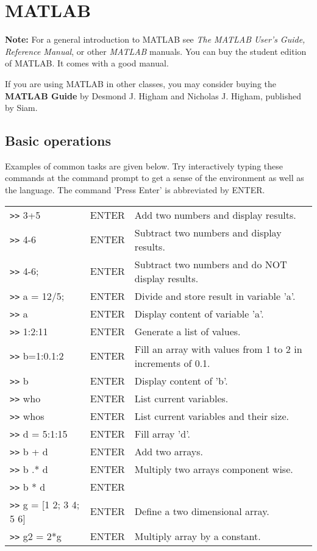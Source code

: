 
\newcommand{\mlc}[1] {\texttt{>> #1 }}
\newcommand{\ttt}[1]{\texttt{#1}}

\section{MATLAB} 

\textbf{Note:} For a general introduction to MATLAB see \textit{The
  MATLAB User's Guide, Reference Manual}, or other \textit{MATLAB}
manuals.  You can buy the student edition of MATLAB.  It comes with a
good manual. 

If you are using MATLAB in other classes, you may consider buying the 
\textbf{MATLAB Guide} by Desmond J. Higham and Nicholas J. Higham, published
by Siam.  

\subsection{Basic operations} Examples of common tasks are given
below.  Try interactively typing these commands at the command prompt
to get a sense of the environment as well as the language. The
command 'Press Enter' is abbreviated by ENTER.

\vspace{2em}


\begin{tabular}{lll} 
  \ttt{>>} 3+5     &ENTER   &Add two numbers and display results. \\ 
  \ttt{>>} 4-6     &ENTER   &Subtract two numbers and display results. \\ 
  \ttt{>>} 4-6;    &ENTER   &Subtract two numbers and do NOT
  display results.\\
  \ttt{>>} a = 12/5; &ENTER   &Divide and store result in variable 'a'.\\
  \ttt{>>} a        &ENTER  &Display content of variable 'a'. \\
  \ttt{>>} 1:2:11   &ENTER  &Generate a list of values. \\
  \ttt{>>} b=1:0.1:2 &ENTER & Fill an array with values from 1 to
  2 in increments of 0.1.\\
  \ttt{>>} b          &ENTER & Display content of 'b'. \\
  \ttt{>>} who      &ENTER  &List current variables. \\
  \ttt{>>} whos     &ENTER  &List current variables and their size.\\
  \ttt{>>} d = 5:1:15 &ENTER &Fill array 'd'. \\
  \ttt{>>} b + d     &ENTER &Add two arrays. \\
  \ttt{>>} b .* d    &ENTER & Multiply two arrays component wise. \\
  \ttt{>>} b * d     &ENTER & \\ 
  \ttt{>>} g = [1 2; 3 4; 5 6] &ENTER &Define a two dimensional array. \\
  \ttt{>>} g2 = 2*g  &ENTER & Multiply array by a constant. \\
\end{tabular}

